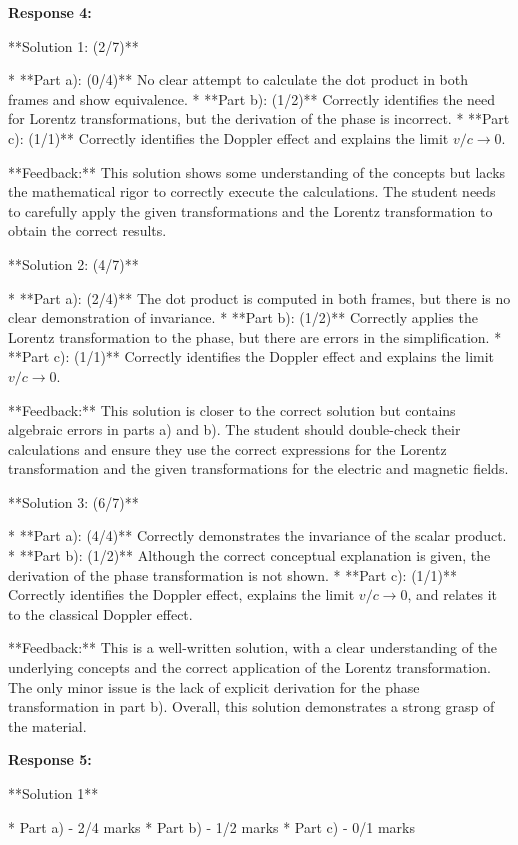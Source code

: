 \documentclass[a4paper,11pt]{article}
\begin{document}
\bigskip    
\textbf{Response 4:}

**Solution 1: (2/7)**

*   **Part a): (0/4)** No clear attempt to calculate the dot product in both frames and show equivalence.
*   **Part b): (1/2)** Correctly identifies the need for Lorentz transformations, but the derivation of the phase is incorrect.
*   **Part c): (1/1)** Correctly identifies the Doppler effect and explains the limit $v/c \to 0$.

**Feedback:** This solution shows some understanding of the concepts but lacks the mathematical rigor to correctly execute the calculations. The student needs to carefully apply the given transformations and the Lorentz transformation to obtain the correct results.

**Solution 2: (4/7)**

*   **Part a): (2/4)** The dot product is computed in both frames, but there is no clear demonstration of invariance.
*   **Part b): (1/2)** Correctly applies the Lorentz transformation to the phase, but there are errors in the simplification.
*   **Part c): (1/1)** Correctly identifies the Doppler effect and explains the limit $v/c \to 0$.

**Feedback:** This solution is closer to the correct solution but contains algebraic errors in parts a) and b). The student should double-check their calculations and ensure they use the correct expressions for the Lorentz transformation and the given transformations for the electric and magnetic fields.

**Solution 3: (6/7)**

*   **Part a): (4/4)** Correctly demonstrates the invariance of the scalar product.
*   **Part b): (1/2)** Although the correct conceptual explanation is given, the derivation of the phase transformation is not shown.
*   **Part c): (1/1)** Correctly identifies the Doppler effect, explains the limit \( v/c \to 0 \), and relates it to the classical Doppler effect.

**Feedback:** This is a well-written solution, with a clear understanding of the underlying concepts and the correct application of the Lorentz transformation. The only minor issue is the lack of explicit derivation for the phase transformation in part b). Overall, this solution demonstrates a strong grasp of the material.

\bigskip    
\textbf{Response 5:}

**Solution 1**

*   Part a) - 2/4 marks
*   Part b) - 1/2 marks
*   Part c) - 0/1 marks
\end{document}
